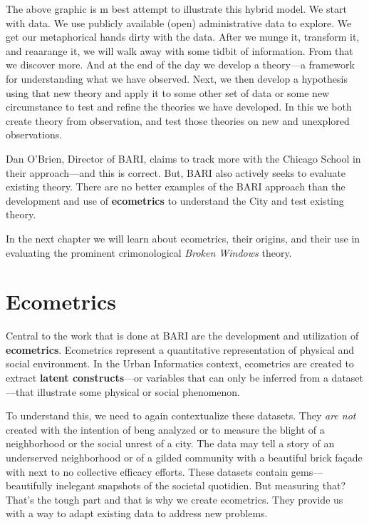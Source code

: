 \documentclass[
]{book}
\begin{document}
The above graphic is m best attempt to illustrate this hybrid model. We start with data. We use publicly available (open) administrative data to explore. We get our metaphorical hands dirty with the data. After we munge it, transform it, and reaarange it, we will walk away with some tidbit of information. From that we discover more. And at the end of the day we develop a theory---a framework for understanding what we have observed. Next, we then develop a hypothesis using that new theory and apply it to some other set of data or some new circumstance to test and refine the theories we have developed. In this we both create theory from observation, and test those theories on new and unexplored observations.

Dan O'Brien, Director of BARI, claims to track more with the Chicago School in their approach---and this is correct. But, BARI also actively seeks to evaluate existing theory. There are no better examples of the BARI approach than the development and use of \textbf{ecometrics} to understand the City and test existing theory.

In the next chapter we will learn about ecometrics, their origins, and their use in evaluating the prominent crimonological \emph{Broken Windows} theory.

\hypertarget{ecometrics}{%
\chapter{Ecometrics}\label{ecometrics}}

Central to the work that is done at BARI are the development and utilization of \textbf{ecometrics}. Ecometrics represent a quantitative representation of physical and social environment. In the Urban Informatics context, ecometrics are created to extract \textbf{latent constructs}---or variables that can only be inferred from a dataset---that illustrate some physical or social phenomenon.

To understand this, we need to again contextualize these datasets. They \emph{are not} created with the intention of beng analyzed or to measure the blight of a neighborhood or the social unrest of a city. The data may tell a story of an underserved neighborhood or of a gilded community with a beautiful brick façade with next to no collective efficacy efforts. These datasets contain gems---beautifully inelegant snapshots of the societal quotidien. But measuring that? That's the tough part and that is why we create ecometrics. They provide us with a way to adapt existing data to address new problems.
\end{document}
